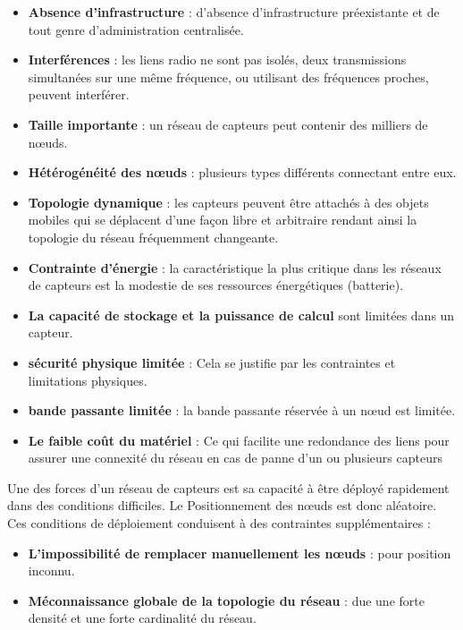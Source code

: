 \begin{itemize}

\item \textbf{Absence d’infrastructure} : d’absence d’infrastructure préexistante et de tout genre d’administration centralisée.

\item \textbf{Interférences} : les liens radio ne sont pas isolés, deux transmissions simultanées sur une même fréquence, ou utilisant des fréquences proches, peuvent interférer.

\item \textbf{Taille importante} : un réseau de capteurs peut contenir des milliers de nœuds.

\item \textbf{Hétérogénéité des nœuds} : plusieurs types différents connectant entre eux.

\item \textbf{Topologie dynamique} : les capteurs peuvent être attachés à des objets mobiles qui se déplacent d’une façon libre et arbitraire rendant ainsi la topologie du réseau fréquemment changeante.

\item \textbf{Contrainte d’énergie} : la caractéristique la plus critique dans les réseaux de capteurs est la modestie de ses ressources énergétiques (batterie).

\item \textbf{La capacité de stockage et la puissance de calcul} sont limitées dans un capteur.

\item \textbf{sécurité physique limitée} : Cela se justifie par les contraintes et limitations physiques.

\item \textbf{bande passante limitée} : la bande passante réservée à un nœud est limitée.

\item \textbf{Le faible coût du matériel} : Ce qui facilite une redondance des liens pour assurer une connexité du réseau en cas de panne d’un ou plusieurs capteurs

\end{itemize}

Une des forces d’un réseau de capteurs est sa capacité à être déployé rapidement dans des conditions difficiles. Le Positionnement des nœuds est donc aléatoire. Ces conditions de déploiement conduisent à des contraintes supplémentaires :

\begin{itemize}

\item \textbf{L’impossibilité de remplacer manuellement les nœuds} : pour position inconnu.

\item \textbf{Méconnaissance globale de la topologie du réseau} : due une forte densité et une forte cardinalité du réseau.

\end{itemize}


